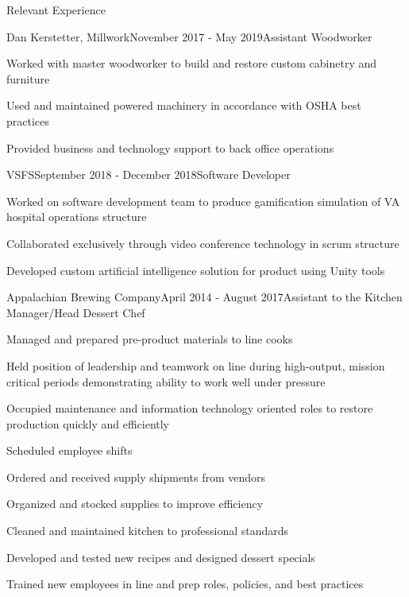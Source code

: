 \documentclass{resume} %
\begin{document}
\begin{rSection}{Relevant Experience}

\begin{rWorkSubsection}{Dan Kerstetter, Millwork}{November 2017 - May 2019}{Assistant Woodworker}{}
\item Worked with master woodworker to build and restore custom cabinetry and furniture
\item Used and maintained powered machinery in accordance with OSHA best practices
\item Provided business and technology support to back office operations
\end{rWorkSubsection}


\begin{rWorkSubsection}{VSFS}{September 2018 - December 2018}{Software Developer}{}
\item Worked on software development team to produce gamification simulation of VA hospital operations structure
\item Collaborated exclusively through video conference technology in scrum structure
\item Developed custom artificial intelligence solution for product using Unity tools
\end{rWorkSubsection}


\begin{rWorkSubsection}{Appalachian Brewing Company}{April 2014 - August 2017}{Assistant to the Kitchen Manager/Head Dessert Chef}{}
\item Managed and prepared pre-product materials to line cooks
\item Held position of leadership and teamwork on line during high-output, mission critical periods demonstrating ability to work well under pressure
\item Occupied maintenance and information technology oriented roles to restore production quickly and efficiently
\item Scheduled employee shifts
\item Ordered and received supply shipments from vendors
\item Organized and stocked supplies to improve efficiency
\item Cleaned and maintained kitchen to professional standards
\item Developed and tested new recipes and designed dessert specials
\item Trained new employees in line and prep roles, policies, and best practices
\end{rWorkSubsection}


\end{rSection}
\end{document}
